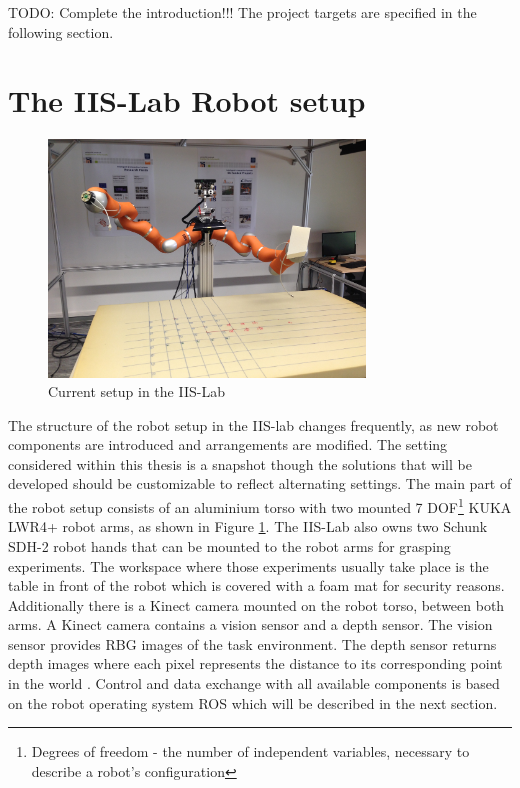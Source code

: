 TODO: Complete the introduction!!! The project targets are specified in the following section.



\section{The IIS-Lab Robot setup}
\begin{figure}[ht]
	\centering
  \includegraphics[width=0.75\textwidth]{images/robot_setup.jpg}
	\caption{Current setup in the IIS-Lab}
	\label{fig:iis_setup}
\end{figure}

The structure of the robot setup in the IIS-lab changes frequently, as new robot components are introduced and arrangements are modified. The setting considered within this thesis is a snapshot though the solutions that will be developed should be customizable to reflect alternating settings. The main part of the robot setup consists of an aluminium torso with two mounted 7 DOF\footnote{Degrees of freedom - the number of independent variables, necessary to describe a robot's configuration} KUKA LWR4+ \citep{kuka2012} robot arms, as shown in Figure \ref{fig:iis_setup}. The IIS-Lab also owns two Schunk SDH-2 \citep{schunk2010} robot hands that can be mounted to the robot arms for grasping experiments. The workspace where those experiments usually take place is the table in front of the robot which is covered with a foam mat for security reasons. Additionally there is a Kinect camera mounted on the robot torso, between both arms. A Kinect camera contains a vision sensor and a depth sensor. The vision sensor provides RBG images of the task environment. The depth sensor returns depth images where each pixel represents the distance to its corresponding point in the world \citep{andersen2012}. Control and data exchange with all available components is based on the robot operating system ROS which will be described in the next section.

